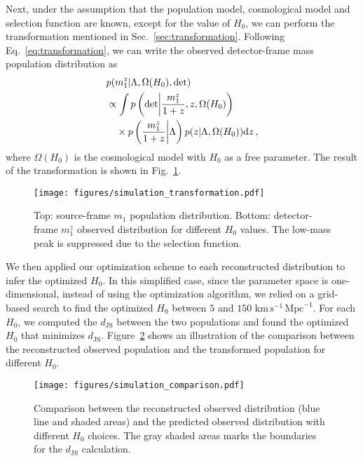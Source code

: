 \documentclass[sn-aps, pdflatex, iicol]{sn-jnl}
\begin{document}
Next, under the assumption that the population model, cosmological model and selection function are known, except for the value of $H_0$, we can perform the transformation mentioned in Sec.~\ref{sec:transformation}.
Following Eq.~\eqref{eq:transformation}, we can write the observed detector-frame mass population distribution as
\begin{equation}
    \mathtoolsset{multlined-width=0.89\displaywidth}
    \begin{aligned}
        &p(m^z_1|\Lambda, \Omega(H_0), \mathrm{det}) \\
        &\begin{multlined}
            \propto \int p\left(\mathrm{det}\middle|\frac{m^z_1}{1+z},z,\Omega(H_0)\right) \\ \times p\left(\frac{m^z_1}{1+z}\middle|\Lambda\right)p(z|\Lambda, \Omega(H_0)) \mathrm{d}z\,,
        \end{multlined}
    \end{aligned}
    \label{eq:transformation_H0}
\end{equation}
where $\Omega(H_0)$ is the cosmological model with $H_0$ as a free parameter.
The result of the transformation is shown in Fig.~\ref{fig:simulation_transformation}.
\begin{figure}
    \texttt{[image: figures/simulation\_transformation.pdf]}
    \caption{
        Top: source-frame $m_1$ population distribution.
        Bottom: detector-frame $m^z_1$ observed distribution for different $H_0$ values. The low-mass peak is suppressed due to the selection function.
    }
    \label{fig:simulation_transformation}
\end{figure}

We then applied our optimization scheme to each reconstructed distribution to infer the optimized $H_0$.
In this simplified case, since the parameter space is one-dimensional, instead of using the optimization algorithm, we relied on a grid-based search to find the optimized $H_0$ between $5$ and $150$ $\mathrm{km}\,\mathrm{s}^{-1}\,\mathrm{Mpc}^{-1}$.
For each $H_0$, we computed the $d_\mathrm{JS}$ between the two populations and found the optimized $H_0$ that minimizes $d_\mathrm{JS}$.
Figure~\ref{fig:simulation_comparison} shows an illustration of the comparison between the reconstructed observed population and the transformed population for different $H_0$.
\begin{figure}
    \texttt{[image: figures/simulation\_comparison.pdf]}
    \caption{
        Comparison between the reconstructed observed distribution (blue line and shaded areas) and the predicted observed distribution with different $H_0$ choices. The gray shaded areas marks the boundaries for the $d_\mathrm{JS}$ calculation.
    }
    \label{fig:simulation_comparison}
\end{figure}
\end{document}
